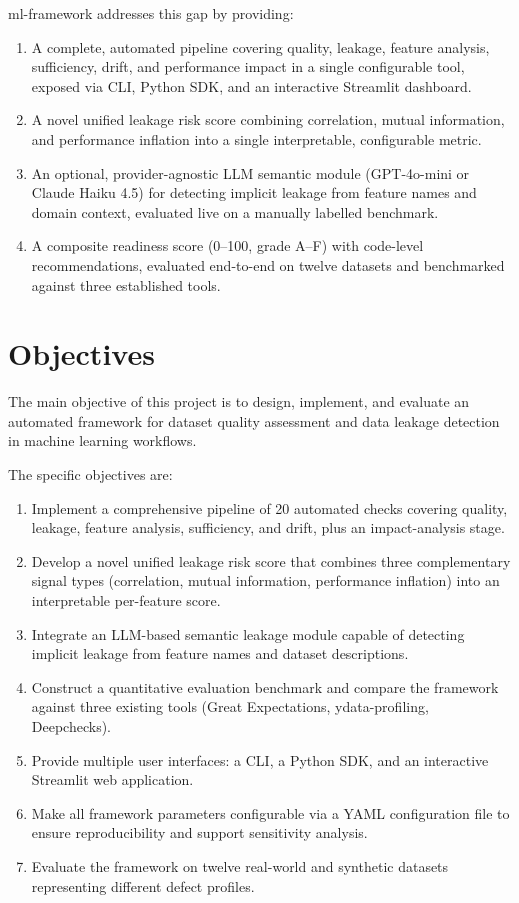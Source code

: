\documentclass[12pt,a4paper]{report}
\begin{document}
ml-framework addresses this gap by providing:
\begin{enumerate}[leftmargin=1.5em]
\item A complete, automated pipeline covering quality, leakage, feature analysis, sufficiency,
  drift, and performance impact in a single configurable tool, exposed via CLI, Python SDK,
  and an interactive Streamlit dashboard.
\item A novel unified leakage risk score combining correlation, mutual information, and
  performance inflation into a single interpretable, configurable metric.
\item An optional, provider-agnostic LLM semantic module (GPT-4o-mini or Claude Haiku 4.5)
  for detecting implicit leakage from feature
  names and domain context, evaluated live on a manually labelled benchmark.
\item A composite readiness score (0--100, grade A--F) with code-level recommendations,
  evaluated end-to-end on twelve datasets and benchmarked against three established tools.
\end{enumerate}

\section{Objectives}
\label{sec:objectives}

The main objective of this project is to design, implement, and evaluate an automated
framework for dataset quality assessment and data leakage detection in machine learning
workflows.

The specific objectives are:

\begin{enumerate}[leftmargin=1.5em]
\item Implement a comprehensive pipeline of 20 automated checks covering quality, leakage,
feature analysis, sufficiency, and drift, plus an impact-analysis stage.
\item Develop a novel unified leakage risk score that combines three complementary signal
types (correlation, mutual information, performance inflation) into an interpretable
per-feature score.
\item Integrate an LLM-based semantic leakage module capable of detecting implicit leakage
from feature names and dataset descriptions.
\item Construct a quantitative evaluation benchmark and compare the framework against three
existing tools (Great Expectations, ydata-profiling, Deepchecks).
\item Provide multiple user interfaces: a CLI, a Python SDK, and an interactive Streamlit
web application.
\item Make all framework parameters configurable via a YAML configuration file to ensure
reproducibility and support sensitivity analysis.
\item Evaluate the framework on twelve real-world and synthetic datasets representing
different defect profiles.
\end{enumerate}
\end{document}
